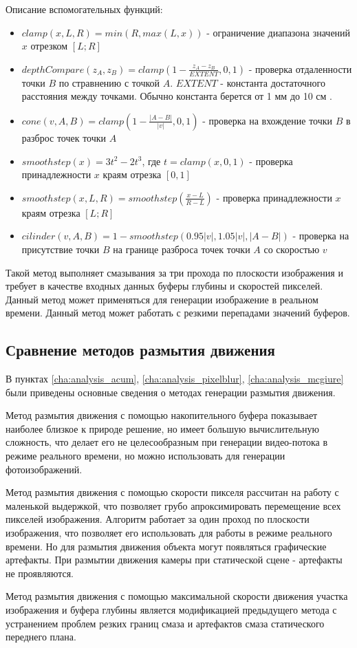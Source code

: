 Описание вспомогательных функций:
\begin{itemize}
    \item $clamp(x, L, R) = min(R, max(L, x))$ - ограничение диапазона значений $x$ отрезком $[L;R]$
    \item $depthCompare(z_A, z_B) = clamp(1 - \frac{z_A - z_B}{EXTENT}, 0, 1)$ - проверка отдаленности точки $B$ по стравнению с точкой $A$. $EXTENT$ - константа достаточного расстояния между точками. Обычно константа берется от 1 мм до 10 см  \cite{McGuire12}.
    \item $cone(v, A, B) = clamp(1 - \frac{|A-B|}{|v|}, 0,1)$ - проверка на вхождение точки $B$ в разброс точек точки $A$
    \item $smoothstep(x) = 3 t^2 - 2t^3$, где $t = clamp(x, 0, 1)$ -  проверка принадлежности $x$ краям отрезка $[0, 1]$
    \item $smoothstep(x, L, R) = smoothstep(\frac{x - L}{R -
                  L})$ - проверка принадлежности $x$ краям отрезка $[L; R]$
    \item $cilinder(v, A, B) = 1 - smoothstep(0.95 |v|, 1.05|v|, |A - B|)$ - проверка на присутствие точки $B$ на границе разброса точек точки $A$ со скоростью $v$
\end{itemize}

Такой метод выполняет смазывания за три прохода по плоскости изображения и требует в качестве входных данных буферы глубины и скоростей пикселей. Данный метод может применяться для генерации изображение в реальном времени. Данный метод может работать с резкими перепадами значений буферов.

\subsection{Сравнение методов размытия движения}

В пунктах \ref{cha:analysis_acum}, \ref{cha:analysis_pixelblur}, \ref{cha:analysis_mcgiure} были приведены основные сведения о методах генерации размытия движения.
\par

Метод размытия движения с помощью накопительного буфера показывает наиболее близкое к природе решение, но имеет большую вычислительную сложность, что делает его не целесообразным при генерации видео-потока в режиме реального времени, но можно использовать для генерации фотоизображений.
\par
Метод размытия движения с помощью скорости пикселя рассчитан на работу с маленькой выдержкой, что позволяет грубо апроксимировать перемещение всех пикселей изображения. Алгоритм работает за один проход по плоскости изображения, что позволяет его использовать для работы в режиме реального времени. Но для размытия движения объекта могут появляться графические артефакты. При размытии движения камеры при статической сцене - артефакты не проявляются.
\par
Метод размытия движения с помощью максимальной скорости движения участка изображения и буфера глубины является модификацией предыдущего метода с устранением проблем резких границ смаза и артефактов смаза статического переднего плана.


